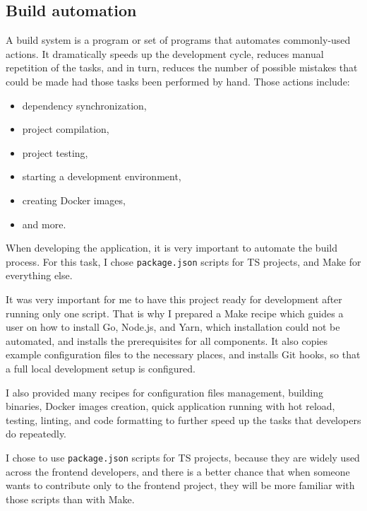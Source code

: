 \subsection{Build automation}\label{sec:build-automation}

A build system is a program or set of programs
that automates commonly-used actions.
It dramatically speeds up the development cycle,
reduces manual repetition of the tasks,
and in turn,
reduces the number of possible mistakes
that could be made had those tasks
been performed by hand.
Those actions include:
\begin{itemize}
  \item dependency synchronization,
  \item project compilation,
  \item project testing,
  \item starting a development environment,
  \item creating Docker images,
  \item and more.
\end{itemize}

When developing the application,
it is very important to automate the build process.
For this task,
I chose \texttt{package.json} scripts
for \ac{TS} projects,
and Make for everything else.

It was very important for me
to have this project ready for development
after running only one script.
That is why I prepared a Make recipe
which guides a user on how to install
Go, Node.js, and Yarn,
which installation could not be automated,
and installs the prerequisites for all components.
It also copies example configuration files
to the necessary places,
and installs Git hooks,
so that a full local development setup
is configured.

I also provided many recipes
for configuration files management,
building binaries,
Docker images creation,
quick application running with hot reload,
testing,
linting, and
code formatting
to further speed up the tasks
that developers do repeatedly.

I chose to use \texttt{package.json} scripts
for \ac{TS} projects,
because they are widely used
across the frontend developers,
and there is a better chance
that when someone wants to contribute
only to the frontend project,
they will be more familiar with those scripts
than with Make.
